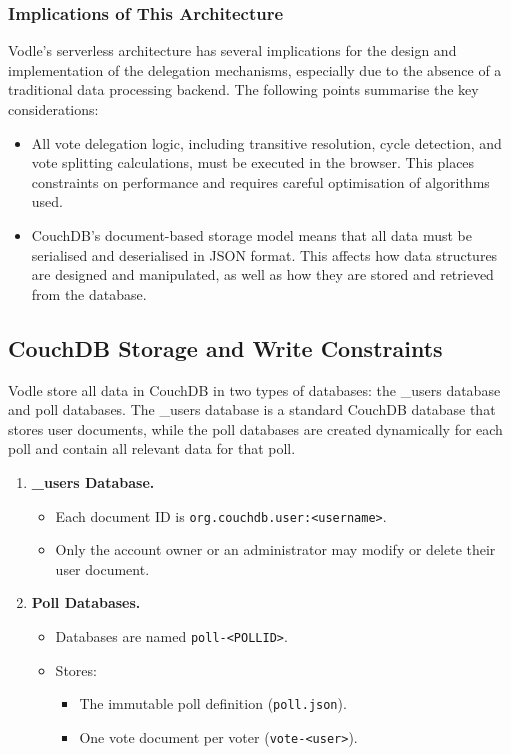 \subsubsection{Implications of This Architecture}
Vodle's serverless architecture has several implications for the design and implementation of the delegation mechanisms, especially due to the absence of a traditional data processing backend. The following points summarise the key considerations:
\begin{itemize}
  \item All vote delegation logic, including transitive resolution, cycle detection, and vote splitting calculations, must be executed in the browser. This places constraints on performance and requires careful optimisation of algorithms used.
  \item CouchDB's document-based storage model means that all data must be serialised and deserialised in JSON format. This affects how data structures are designed and manipulated, as well as how they are stored and retrieved from the database.
\end{itemize}

\subsection{CouchDB Storage and Write Constraints}
\label{subsec:couchdb_limits}

Vodle store all data in CouchDB in two types of databases: the \_users database and poll databases. The \_users database is a standard CouchDB database that stores user documents, while the poll databases are created dynamically for each poll and contain all relevant data for that poll.

\begin{enumerate}
  \item \textbf{\_users Database.}
    \begin{itemize}
      \item Each document ID is \texttt{org.couchdb.user:<username>}.
      \item Only the account owner or an administrator may modify or delete their user document.
    \end{itemize}

  \item \textbf{Poll Databases.}
    \begin{itemize}
      \item Databases are named \texttt{poll-<POLLID>}.
      \item Stores:
        \begin{itemize}
          \item The immutable poll definition (\texttt{poll.json}).
          \item One vote document per voter (\texttt{vote-<user>}).
        \end{itemize}
    \end{itemize}
\end{enumerate}

